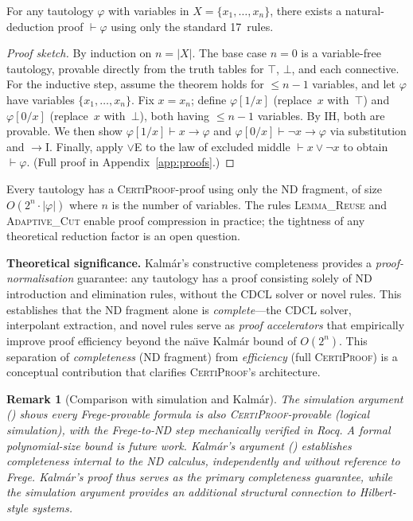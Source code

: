 \documentclass[acmtocl,review,anonymous]{acmart}
\newtheorem{remark}{Remark}
\newcommand{\proves}{\vdash}
\newcommand{\dlor}{\mathbin{\vee}}
\newcommand{\dlnot}{\neg}
\newcommand{\dlimp}{\mathbin{\to}}
\newcommand{\dlbot}{\bot}
\newcommand{\dltop}{\top}
\newcommand{\CP}{\textsc{CertiProof}}
\begin{document}
\begin{theorem}
  \label{thm:constructive-completeness}
  For any tautology $\varphi$ with variables in
  $X = \{x_1, \ldots, x_n\}$, there exists a natural-deduction proof
  $\proves \varphi$ using only the standard 17~rules.
\end{theorem}
\begin{proof}[Proof sketch]
  By induction on $n = |X|$.  The base case $n = 0$ is a
  variable-free tautology, provable directly from the truth tables for
  $\dltop$, $\dlbot$, and each connective.  For the inductive step,
  assume the theorem holds for $\le n-1$ variables, and let
  $\varphi$ have variables $\{x_1,\dots,x_n\}$.  Fix
  $x = x_n$; define $\varphi[1/x]$ (replace~$x$ with~$\dltop$) and
  $\varphi[0/x]$ (replace~$x$ with~$\dlbot$), both having
  $\le n-1$ variables.  By IH, both are provable.  We then show
  $\varphi[1/x] \proves x \dlimp \varphi$ and
  $\varphi[0/x] \proves \dlnot x \dlimp \varphi$ via substitution and
  $\to$\textsc{I}.  Finally, apply $\lor$\textsc{E} to the law of
  excluded middle $\proves x \dlor \dlnot x$ to obtain
  $\proves \varphi$.
  (Full proof in Appendix~\ref{app:proofs}.)
\end{proof}

\begin{corollary}[Kalmar-Completeness for \CP{}]
  Every tautology has a \CP{}-proof using only the ND fragment, of
  size $O(2^n \cdot |\varphi|)$ where $n$ is the number of variables.
  The rules \textsc{Lemma\_Reuse} and \textsc{Adaptive\_Cut} enable
  proof compression in practice; the tightness of any theoretical
  reduction factor is an open question.
\end{corollary}

\medskip
\noindent\textbf{Theoretical significance.}
Kalm\'{a}r's constructive completeness provides a \emph{proof-normalisation}
guarantee: any tautology has a proof consisting solely of ND
introduction and elimination rules, without the CDCL solver or novel
rules.  This establishes that the ND fragment alone is
\emph{complete}---the CDCL solver, interpolant extraction, and novel
rules serve as \emph{proof accelerators} that empirically improve
proof efficiency beyond the na\"{\i}ve Kalm\'{a}r bound of $O(2^n)$.
This separation of \emph{completeness} (ND fragment)
from \emph{efficiency} (full \CP{}) is a conceptual contribution
that clarifies \CP{}'s architecture.

\begin{remark}[Comparison with simulation and Kalm\'{a}r]
  The simulation argument () shows every
  Frege-provable formula is also \CP{}-provable (logical simulation),
  with the Frege-to-ND step mechanically verified in Rocq.  A formal
  polynomial-size bound is future work.  Kalm\'{a}r's argument
  () establishes completeness
  \emph{internal} to the ND calculus, independently and without
  reference to Frege.  Kalm\'{a}r's proof thus serves as the primary
  completeness guarantee, while the simulation argument provides an
  additional structural connection to Hilbert-style systems.
\end{remark}
\end{document}
